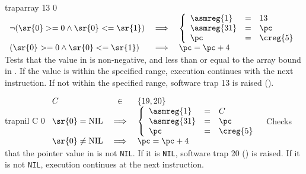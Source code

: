 \begin{instruction}{traparray}\label{inst:traparray}
     {13}
     {0}
     { %
       \begin{math}
         \begin{array}{lcl}
           \neg (\sr{0} >= 0 \wedge \sr{0} <= \sr{1}) & \implies &
           \left\lbrace
           \begin{array}{lcl}
             \asmreg{1} & = & 13 \\
             \asmreg{31} & = & \pc \\
             \pc & = & \creg{5} \\
           \end{array}
           \right. \\

           (\sr{0} >= 0 \wedge \sr{0} <= \sr{1}) & \implies & \pc = \pc + 4 \\
         \end{array}
       \end{math}
     }
     {
       Tests that the value in  is non-negative, and less than
       or equal to the array bound in .  If the value is within
       the specified range, execution continues with the next
       instruction.  If not within the specified range, software trap
       13 is raised ().
     }
\end{instruction}


\begin{instruction}{trapnil}\label{inst:trapnil}
     {C}
     {0}
     { %
       \begin{math}
         \begin{array}{lcl}
           C & \in & \lbrace 19, 20 \rbrace \\
           \sr{0} = \textrm{NIL} & \implies &
           \left\lbrace
           \begin{array}{lcl}
             \asmreg{1} & = & C \\
             \asmreg{31} & = & \pc \\
             \pc & = & \creg{5} \\
           \end{array}
           \right. \\
           \sr{0} \neq \textrm{NIL} & \implies & \pc = \pc + 4 \\
         \end{array}
       \end{math}
     }
     {
       Checks that the pointer value in  is not \texttt{NIL}.
       If it is \texttt{NIL}, software trap 20 () is
       raised.  If it is not \texttt{NIL}, execution continues at the
       next instruction.
     }
\end{instruction}


